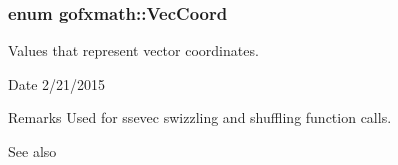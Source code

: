 \subsubsection[{Vec\+Coord}]{\setlength{\rightskip}{0pt plus 5cm}enum {\bf gofxmath\+::\+Vec\+Coord}}\label{namespacegofxmath_a6c05153fd2e2d4119d91daca01a06741}


Values that represent vector coordinates. 

\begin{DoxyDate}{Date}
2/21/2015
\end{DoxyDate}
\begin{DoxyRemark}{Remarks}
Used for ssevec swizzling and shuffling function calls.
\end{DoxyRemark}
\begin{DoxySeeAlso}{See also}

\end{DoxySeeAlso}
